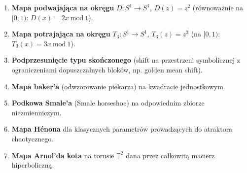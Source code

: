 \documentclass[11pt,a4paper]{article}
\theoremstyle{plain}
\theoremstyle{definition}
\begin{document}
\begin{enumerate}[label=\arabic*.]
    \item \textbf{Mapa podwajająca na okręgu} $D:S^1\to S^1$, $D(z)=z^2$ (równoważnie na $[0,1)$: $D(x)=2x\ \mathrm{mod}\ 1$).
    \item \textbf{Mapa potrajająca na okręgu} $T_3:S^1\to S^1$, $T_3(z)=z^3$ (na $[0,1)$: $T_3(x)=3x\ \mathrm{mod}\ 1$).
    \item \textbf{Podprzesunięcie typu skończonego} (shift na przestrzeni symbolicznej z ograniczeniami dopuszczalnych bloków, np. golden mean shift).
    \item \textbf{Mapa baker'a} (odwzorowanie piekarza) na kwadracie jednostkowym.
    \item \textbf{Podkowa Smale'a} (Smale horseshoe) na odpowiednim zbiorze niezmienniczym.
    \item \textbf{Mapa Hénona} dla klasycznych parametrów prowadzących do atraktora chaotycznego.
    \item \textbf{Mapa Arnol'da kota} na torusie $\mathbb{T}^2$ dana przez całkowitą macierz hiperboliczną.
\end{enumerate}
\end{document}
